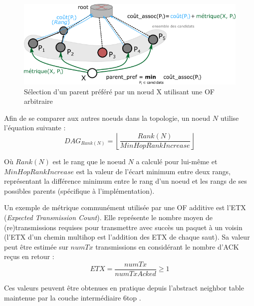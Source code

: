 \documentclass[]{report}
\newcommand{\floor}[1]{\left\lfloor #1 \right\rfloor}
\begin{document}
	\begin{figure}[!h]
	\centering
	\includegraphics[width=0.85\linewidth]{OF_sel_parent}
	\caption{Sélection d'un parent préféré par un nœud X utilisant une OF arbitraire}
	\label{fig:OF}
	\end{figure}

\vspace{0.3cm}

Afin de se comparer aux autres noeuds dans la topologie, un noeud $N$ utilise l'équation suivante :
\[
DAG_{Rank(N)} = \floor{\frac{Rank(N)}{MinHopRankIncrease}}
\]

\noindent Où $Rank(N)$ est le rang que le noeud $N$ a calculé pour lui-même et $MinHopRankIncrease$ est la valeur de l'écart minimum entre deux rangs, représentant la différence minimum entre le rang d'un noeud et les rangs de ses possibles parents (spécifique à l'implémentation).

\newpage

\par Un exemple de métrique communément utilisée par une OF additive est l'ETX (\textit{Expected Transmission Count}). Elle représente le nombre moyen de (re)transmissions requises pour transmettre avec succès un paquet à un voisin (l'ETX d'un chemin multihop est l'addition des ETX de chaque saut). Sa valeur peut être estimée sur $numTx$ transmissions en considérant le nombre d'ACK reçus en retour : 
\begin{equation}
ETX = \frac{numTx}{numTxAcked} \geq 1
\end{equation}

\noindent Ces valeurs peuvent être obtenues en pratique depuis l'abstract neighbor table maintenue par la couche intermédiaire 6top \cite{ietf-6tisch-architecture-28}.
\end{document}
